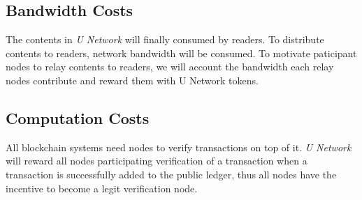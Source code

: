 \subsection{Bandwidth Costs}
The contents in \emph{U Network} will finally consumed by readers. To distribute contents to readers, network bandwidth will be consumed. To motivate paticipant nodes to relay contents to readers, we will account the bandwidth each relay nodes contribute and reward them with U Network tokens.

\subsection{Computation Costs}
All blockchain systems need nodes to verify transactions on top of it. \emph{U Network} will reward all nodes participating verification of a transaction when a transaction is successfully added to the public ledger, thus all nodes have the incentive to become a legit verification node. 
